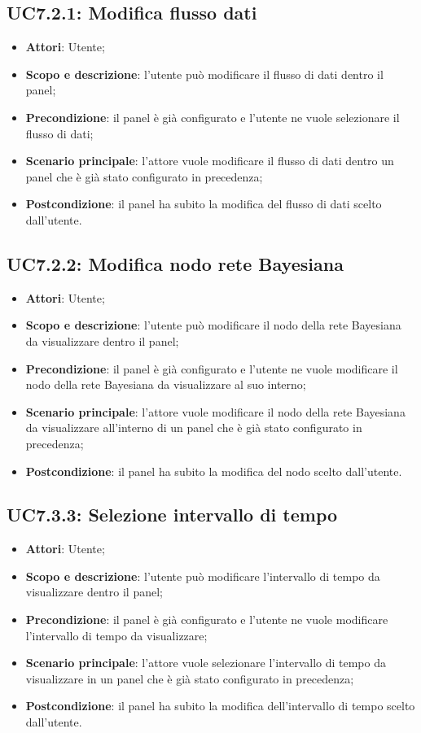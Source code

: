 \subsection{UC7.2.1: Modifica flusso dati}
\hypertarget{UC7.2.1}{}
\begin{itemize}
	\item \textbf{Attori}: Utente;
	\item \textbf{Scopo e descrizione}: l'utente può modificare il flusso di dati dentro il panel;
	\item \textbf{Precondizione}: il panel è già configurato e l'utente ne vuole selezionare il flusso di dati;
	\item \textbf{Scenario principale}: l'attore vuole modificare il flusso di dati dentro un panel che è già stato configurato in precedenza;
	\item \textbf{Postcondizione}: il panel ha subito la modifica del flusso di dati scelto dall'utente.
\end{itemize}
\subsection{UC7.2.2: Modifica nodo rete Bayesiana }
\hypertarget{UC7.2.2}{}
\begin{itemize}
	\item \textbf{Attori}: Utente;
	\item \textbf{Scopo e descrizione}: l'utente può modificare il nodo della rete Bayesiana da visualizzare dentro il panel;
	\item \textbf{Precondizione}: il panel è già configurato e l'utente ne vuole modificare il nodo della rete Bayesiana da visualizzare al suo interno;
	\item \textbf{Scenario principale}: l'attore vuole modificare il nodo della rete Bayesiana da visualizzare all'interno di un panel che è già stato configurato in precedenza;
	\item \textbf{Postcondizione}: il panel ha subito la modifica del nodo scelto dall'utente.
\end{itemize}
\subsection{UC7.3.3: Selezione intervallo di tempo }
\hypertarget{UC7.3.3}{}
\begin{itemize}
	\item \textbf{Attori}: Utente;
	\item \textbf{Scopo e descrizione}: l'utente può modificare l'intervallo di tempo da visualizzare dentro il panel;
	\item \textbf{Precondizione}: il panel è già configurato e l'utente ne vuole modificare l'intervallo di tempo da visualizzare;
	\item \textbf{Scenario principale}: l'attore vuole selezionare l'intervallo di tempo da visualizzare in un panel che è già stato configurato in precedenza;
	\item \textbf{Postcondizione}: il panel ha subito la modifica dell'intervallo di tempo scelto dall'utente.
\end{itemize}
